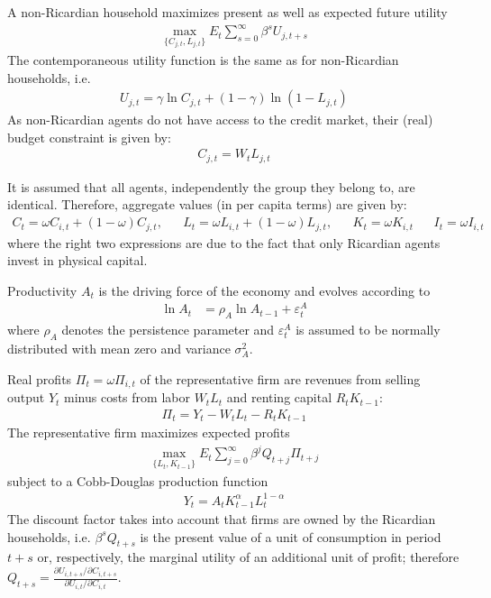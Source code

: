 \documentclass[a4paper]{scrartcl}
\begin{document}
A non-Ricardian household maximizes present as well as expected future utility
\begin{align*}
\underset{\{C_{j,t},L_{j,t}\}}{\max} E_t \sum_{s=0}^{\infty} \beta^{s} U_{j,t+s}
\end{align*}
The contemporaneous utility function is the same as for non-Ricardian households, i.e.
\begin{align*}
U_{j,t} = \gamma \ln C_{j,t} + (1-\gamma) \ln{(1-L_{j,t})}
\end{align*}
As non-Ricardian agents do not have access to the credit market, their (real) budget constraint is given by:
\begin{align*}
C_{j,t} = W_t L_{j,t}
\end{align*}

It is assumed that all agents, independently the group they belong to, are identical. Therefore, aggregate values (in per capita terms) are given by:
\begin{align*}
	C_t = \omega C_{i,t} + (1-\omega)C_{j,t}, && 		L_t = \omega L_{i,t} + (1-\omega)L_{j,t}, && K_t = \omega K_{i,t} &&	I_t = \omega I_{i,t}
\end{align*}
where the right two expressions are due to the fact that only Ricardian agents invest in physical capital.

Productivity $A_t$ is the driving force of the economy and evolves according to
\begin{align*}
\ln{A_{t}} &= \rho_A \ln{A_{t-1}}  + \varepsilon_t^A
\end{align*}
where $\rho_A$ denotes the persistence parameter and $\varepsilon_t^A$ is assumed to be normally distributed with mean zero and variance $\sigma_A^2$.

Real profits $\Pi_t = \omega \Pi_{i,t}$ of the representative firm are revenues from selling output $Y_t$ minus costs from labor $W_t L_t$ and renting capital $R_t K_{t-1}$:
\begin{align*}
\Pi_t = Y_{t} - W_{t} L_{t} - R_{t} K_{t-1}
\end{align*}	
The representative firm maximizes expected profits
\begin{align*}
\underset{\{L_{t},K_{t-1}\}}{\max} E_t \sum_{j=0}^{\infty} \beta^j Q_{t+j}\Pi_{t+j}
\end{align*}
subject to a Cobb-Douglas production function
\begin{align*}
Y_t = A_t K_{t-1}^\alpha L_t^{1-\alpha}
\end{align*}
The discount factor takes into account that firms are owned by the Ricardian households, i.e. $\beta^s Q_{t+s}$ is the present value of a unit of consumption in period $t+s$ or, respectively, the marginal utility of an additional unit of profit; therefore $Q_{t+s}=\frac{\partial U_{i,t+s}/\partial C_{i,t+s}}{\partial U_{i,t}/\partial C_{i,t}}$.
\end{document}
